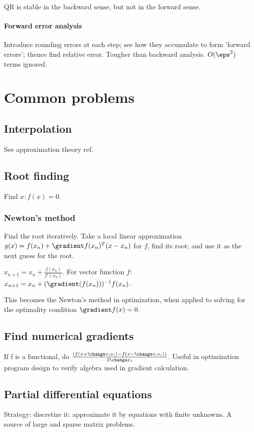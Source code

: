 \documentclass[oneside, article]{memoir}
\begin{document}
QR is stable in the backward sense, but not in the forward sense.

\subsection{Forward error analysis}
Introduce rounding errors at each step; see how they accumulate to form 'forward errors'; thence find relative error. Tougher than backward analysis. $O(\eps^{2})$ terms ignored.

\part{Common problems}
\chapter{Interpolation}
See approximation theory ref.

\chapter{Root finding}
Find $x: f(x) = 0$.

\section{Newton's method}
Find the root iteratively. Take a local linear approximation $g(x) = f(x_n) + \gradient f(x_n)^{T}(x-x_n)$ for $f$, find its root; and use it as the next guess for the root.

$x_{n+1} = x_{n} + \frac{f(x_{n})}{f'(x_{n})}$. For vector function $f$: $x_{n+1} = x_{n} + (\gradient(f(x_{n})))^{-1}f(x_{n})$.

This becomes the Newton's method in optimization, when applied to solving for the optimality condition $\gradient f(x) = 0$.

\chapter{Find numerical gradients}
If f is a functional, do $\frac{(f(x + \change x_i e_i) - f(x - \change x_i e_i))}{2 \change x_i}$. Useful in optimization program design to verify algebra used in gradient calculation.

\chapter{Partial differential equations}
Strategy: discretize it: approximate it by equations with finite unknowns. A source of large and sparse matrix problems.
\end{document}
